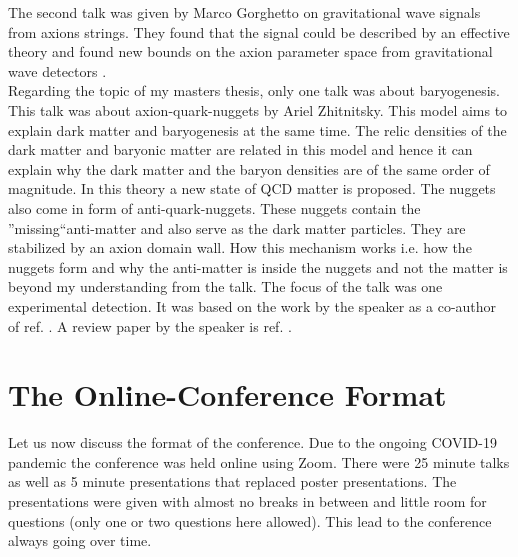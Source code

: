 \documentclass[a4paper]{article}
\begin{document}
\noindent
The second talk was given by Marco Gorghetto on gravitational wave signals
from axions strings. They found that the signal could be described by an effective theory
and found new bounds on the axion parameter space from gravitational wave detectors \cite{Gorghetto_2021}. \\

\noindent
Regarding the topic of my masters thesis, only one talk was about baryogenesis.
This talk was about axion-quark-nuggets by Ariel Zhitnitsky. This model aims to explain
dark matter and baryogenesis at the same time. The relic densities of the dark matter
and baryonic matter are related in this model and hence it can explain why the dark matter
and the baryon densities are of the same order of magnitude. In this theory
a new state of QCD matter is proposed. The nuggets also come in form of anti-quark-nuggets.
These nuggets contain the ''missing``anti-matter and also serve as the dark matter particles.
They are stabilized by an axion domain wall. How this mechanism works i.e. how the nuggets
form and why the anti-matter is inside the nuggets and not the matter is beyond my understanding from
the talk.
The focus of the talk was one experimental detection. It was based on the work by the speaker as a
co-author of ref. \cite{Budker_2020}. A review paper by the speaker is ref. \cite{Zhitnitsky_2021}.


\section{The Online-Conference Format}
Let us now discuss the format of the conference.
Due to the ongoing COVID-19 pandemic the conference was held online using Zoom.
There were 25 minute talks as well as 5 minute presentations that replaced poster presentations.
The presentations were given with almost no breaks in between and little room for questions (only one or two
questions here allowed). This lead to the conference always going over time.
\end{document}
